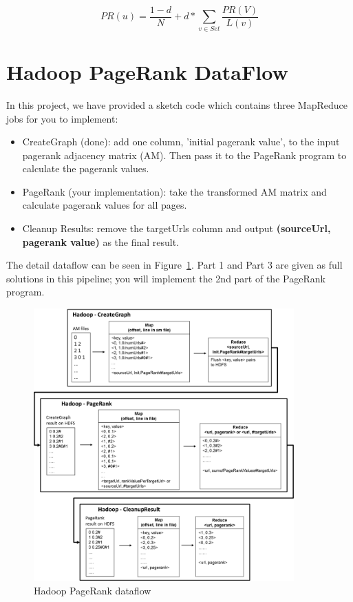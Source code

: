 \documentclass{article}
\begin{document}
\begin{equation}\label{eq:pagerankwithdf}
PR(u) = \frac{1-d}{N} + d * \sum_{v \in Set} \frac{PR(V)}{L(v)}
\end{equation}

\section*{Hadoop PageRank DataFlow}
In this project, we have provided a sketch code which contains three MapReduce jobs for you to implement:
\begin{itemize}
\item CreateGraph (done): add one column, 'initial pagerank value', to the input pagerank adjacency matrix (AM). Then pass it to the PageRank program to calculate the pagerank values. 
\item PageRank (your implementation): take the transformed AM matrix and calculate pagerank values for all pages. 
\item Cleanup Results: remove the targetUrls column and output \textbf{(sourceUrl, pagerank value)} as the final result. 
\end{itemize}

The detail dataflow can be seen in Figure~\ref{fig:hadoopdataflow}. Part 1 and Part 3 are given as full solutions in this pipeline; you will implement the 2nd part of the PageRank program.
\begin{figure}[!htbp]
\centering
\includegraphics[width=10cm]{hadoopdataflow.png}
\caption{Hadoop PageRank dataflow}
\label{fig:hadoopdataflow}
\end{figure}
\end{document}
